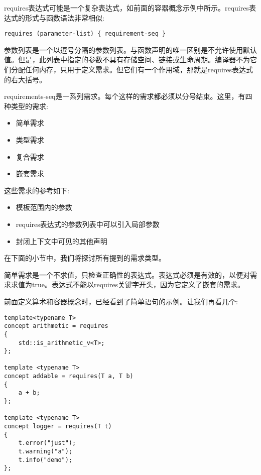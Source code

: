 
requires表达式可能是一个复杂表达式，如前面的容器概念示例中所示。requires表达式的形式与函数语法非常相似:

\begin{lstlisting}[style=styleCXX]
requires (parameter-list) { requirement-seq }
\end{lstlisting}

参数列表是一个以逗号分隔的参数列表。与函数声明的唯一区别是不允许使用默认值。但是，此列表中指定的参数不具有存储空间、链接或生命周期。编译器不为它们分配任何内存，只用于定义需求。但它们有一个作用域，那就是requires表达式的右大括号。

requirements-seq是一系列需求。每个这样的需求都必须以分号结束。这里，有四种类型的需求:

\begin{itemize}
\item
简单需求

\item
类型需求

\item
复合需求

\item
嵌套需求
\end{itemize}

这些需求的参考如下:

\begin{itemize}
\item
模板范围内的参数

\item
requires表达式的参数列表中可以引入局部参数

\item
封闭上下文中可见的其他声明
\end{itemize}

在下面的小节中，我们将探讨所有提到的需求类型。


简单需求是一个不求值，只检查正确性的表达式。表达式必须是有效的，以便对需求求值为true。表达式不能以requires关键字开头，因为它定义了嵌套的需求。

前面定义算术和容器概念时，已经看到了简单语句的示例。让我们再看几个:

\begin{lstlisting}[style=styleCXX]
template<typename T>
concept arithmetic = requires
{
	std::is_arithmetic_v<T>;
};

template <typename T>
concept addable = requires(T a, T b)
{
	a + b;
};

template <typename T>
concept logger = requires(T t)
{
	t.error("just");
	t.warning("a");
	t.info("demo");
};
\end{lstlisting}

